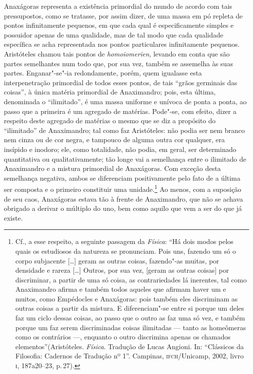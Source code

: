 Anaxágoras representa a existência primordial do mundo de acordo com tais
pressupostos, como se tratasse, por assim dizer, de uma massa em pó repleta
de pontos infinitamente pequenos, em que cada qual é especificamente simples
e possuidor apenas de uma qualidade, mas de tal modo que cada qualidade
específica se acha representada nos pontos particulares infinitamente
pequenos. Aristóteles chamou tais pontos de \textit{homoiomerien}, levando em 
conta que são partes semelhantes num todo
 que, por sua vez, também se assemelha às suas partes.\label{suaspartes} 
 Enganar"-se"-ia redondamente, porém, quem igualasse esta
 interpenetração primordial de todos esses pontos, de tais ``grãos germinais
 das coisas'', à única matéria primordial de Anaximandro; pois, esta última,
 denominada o ``ilimitado'', é uma massa uniforme e unívoca de ponta a ponta,
 ao passo que a primeira é um agregado de matérias. Pode"-se, com efeito,
 dizer a respeito deste agregado de matérias o mesmo que se diz a propósito
 do ``ilimitado'' de Anaximandro; tal como faz Aristóteles: não podia ser nem
 branco nem cinza ou de cor negra, e tampouco de alguma outra cor qualquer,
 era insípido e inodoro; ele, como totalidade, não podia, em geral, ser
 determinado quantitativa ou qualitativamente; tão longe vai a semelhança
 entre o ilimitado de Anaximandro e a mistura primordial de Anaxágoras. Com
 exceção desta semelhança negativa, ambos se diferenciam positivamente pelo
 fato de a última ser composta e o primeiro constituir uma unidade.\footnote
 { Cf., a esse respeito, a seguinte passagem da \textit{Física}: ``Há dois
 modos pelos quais os estudiosos da natureza se pronunciam. Pois uns, fazendo
 um só o corpo subjacente [\ldots] geram as outras coisas, fazendo"-as
 muitas, por densidade e rareza [\ldots] Outros, por sua vez, [geram as
 outras coisas] por discriminar, a partir de uma só coisa, as contrariedades
 lá inerentes, tal como Anaximandro afirma e também todos aqueles que afirmam
 haver um e muitos, como Empédocles e Anaxágoras: pois também eles
 discriminam as outras coisas a partir da mistura. E diferenciam"-se entre si
 porque um deles faz um ciclo dessas coisas, ao passo que o outro as faz uma
 só vez, e também porque um faz serem discriminadas coisas ilimitadas ---
 tanto as homeômeras como os contrários ---, enquanto o outro discrimina
 apenas os chamados elementos''(Aristóteles. \textit{Física}. Tradução de
 Lucas Angioni. In: ``Clássicos da Filosofia: Cadernos de Tradução nº 1''.
 Campinas, \textsc{ifch}/Unicamp, 2002, livro \textsc{i}, 187a20--23,
 p.\,27).} Ao menos, com a suposição de seu caos, Anaxágoras estava tão à
 frente de Anaximandro, que não se achava obrigado a derivar o múltiplo do
 uno, bem como aquilo que vem a ser do que já existe.

